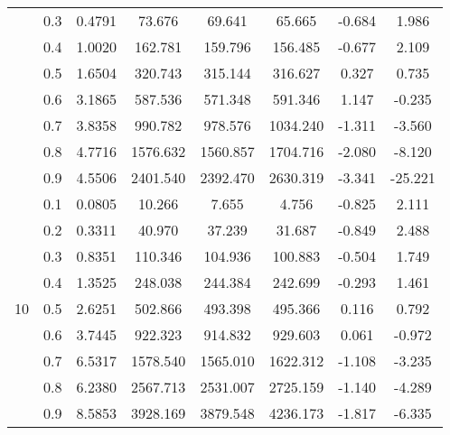 \documentclass[11pt,a4paper]{report}
\begin{document}
\begin{longtable}{ | c | c || c | c | c | c | c | c | }
 & 0.3 & 0.4791 & 73.676 & 69.641 & 65.665 & -0.684 & 1.986 \\
 & 0.4 & 1.0020 & 162.781 & 159.796 & 156.485 & -0.677 & 2.109 \\
 & 0.5 & 1.6504 & 320.743 & 315.144 & 316.627 & 0.327 & 0.735 \\
 & 0.6 & 3.1865 & 587.536 & 571.348 & 591.346 & 1.147 & -0.235 \\
 & 0.7 & 3.8358 & 990.782 & 978.576 & 1034.240 & -1.311 & -3.560 \\
 & 0.8 & 4.7716 & 1576.632 & 1560.857 & 1704.716 & -2.080 & -8.120 \\
 & 0.9 & 4.5506 & 2401.540 & 2392.470 & 2630.319 & -3.341 & -25.221 \\
 \hline
\multirow{9}{*}{10} & 0.1 & 0.0805 & 10.266 & 7.655 & 4.756 & -0.825 & 2.111 \\
 & 0.2 & 0.3311 & 40.970 & 37.239 & 31.687 & -0.849 & 2.488 \\
 & 0.3 & 0.8351 & 110.346 & 104.936 & 100.883 & -0.504 & 1.749 \\
 & 0.4 & 1.3525 & 248.038 & 244.384 & 242.699 & -0.293 & 1.461 \\
 & 0.5 & 2.6251 & 502.866 & 493.398 & 495.366 & 0.116 & 0.792 \\
 & 0.6 & 3.7445 & 922.323 & 914.832 & 929.603 & 0.061 & -0.972 \\
 & 0.7 & 6.5317 & 1578.540 & 1565.010 & 1622.312 & -1.108 & -3.235 \\
 & 0.8 & 6.2380 & 2567.713 & 2531.007 & 2725.159 & -1.140 & -4.289 \\
 & 0.9 & 8.5853 & 3928.169 & 3879.548 & 4236.173 & -1.817 & -6.335 \\
 \hline
\hline
\end{longtable}
\end{document}
